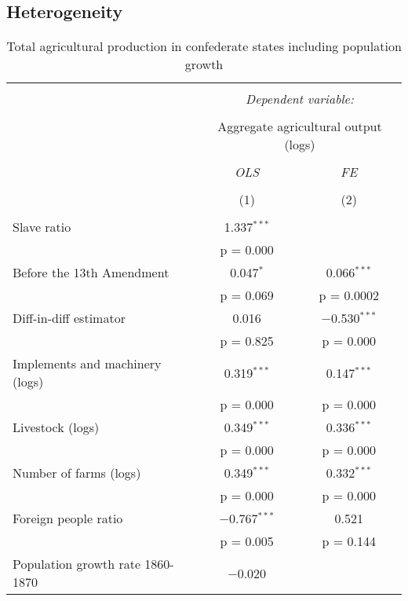 \documentclass[12pt]{report}
\begin{document}
\newpage

\subsection*{Heterogeneity}

\begin{table}[!htbp] \centering 
  \caption{Total agricultural production in confederate states including population growth} 
  \label{tab:agoutcsa} 
\begin{tabular}{@{\extracolsep{5pt}}lcc} 
\\[-1.8ex]\hline 
\hline \\[-1.8ex] 
 & \multicolumn{2}{c}{\textit{Dependent variable:}} \\ 
\cline{2-3} 
\\[-1.8ex] & \multicolumn{2}{c}{Aggregate agricultural output (logs)} \\ 
\\[-1.8ex] & \textit{OLS} & \textit{FE} \\ 
\\[-1.8ex] & (1) & (2)\\ 
\hline \\[-1.8ex] 
 Slave ratio & 1.337$^{***}$ &  \\ 
  & p = 0.000 &  \\ 
  Before the 13th Amendment & 0.047$^{*}$ & 0.066$^{***}$ \\ 
  & p = 0.069 & p = 0.0002 \\ 
  Diff-in-diff estimator & 0.016 & $-$0.530$^{***}$ \\ 
  & p = 0.825 & p = 0.000 \\ 
  Implements and machinery (logs) & 0.319$^{***}$ & 0.147$^{***}$ \\ 
  & p = 0.000 & p = 0.000 \\ 
  Livestock (logs) & 0.349$^{***}$ & 0.336$^{***}$ \\ 
  & p = 0.000 & p = 0.000 \\ 
  Number of farms (logs) & 0.349$^{***}$ & 0.332$^{***}$ \\ 
  & p = 0.000 & p = 0.000 \\ 
  Foreign people ratio & $-$0.767$^{***}$ & 0.521 \\ 
  & p = 0.005 & p = 0.144 \\ 
  Population growth rate 1860-1870 & $-$0.020 &  \\ 

\end{tabular}
\end{table}
\end{document}
